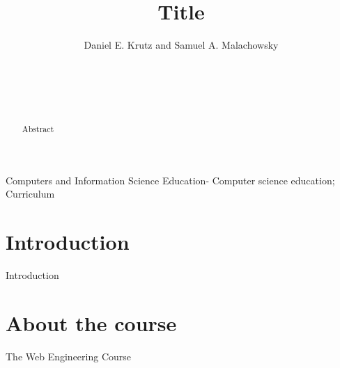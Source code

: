\documentclass{sig-alternate}
\begin{document}

\title{Title}

%
\author{
%
\alignauthor
Daniel E. Krutz and Samuel A. Malachowsky\\ 	
	\\
       \\
       \\
        \\
} %


\maketitle
\begin{abstract}

Abstract





\end{abstract}




Computers and Information
Science Education- Computer science education; Curriculum



\section{Introduction}

Introduction

\section{About the course}
\label{sec: aboutcourse}

The Web Engineering Course

% 
\end{document}
